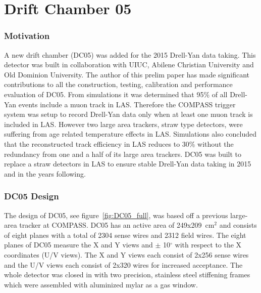 \chapter{Drift Chamber 05}
\subsection{Motivation}
A new drift chamber (DC05) was added for the
2015 Drell-Yan data taking.  This detector was built in collaboration
with UIUC, Abilene Christian University and Old Dominion University.
The author of this prelim paper has made significant contributions to
all the construction, testing, calibration and performance evaluation
of DC05.  From simulations it was determined
that 95\% of all Drell-Yan events include a muon track in LAS.
Therefore the COMPASS trigger system was setup to record Drell-Yan
data only when at least one muon track is included in LAS.
However two large area trackers, straw type detectors, were suffering
from age related temperature effects in LAS.  Simulations also
concluded that the reconstructed track efficiency in LAS reduces to
30\% without the redundancy from one and a half of its large area
trackers.  DC05 was built to replace a straw detectors in LAS to
ensure stable Drell-Yan data taking in 2015 and in the years
following.

\subsection{DC05 Design}


The design of DC05, see figure~\ref{fig:DC05_full}, was based off a
previous large-area tracker at COMPASS.  DC05 has an active area of
249x209~cm$^2$ and consists of eight planes with a total of 2304 sense
wires and 2312 field wires.  The eight planes of DC05 measure the X and Y
views and $\pm$ 10$^{\circ}$ with respect to the X coordinates (U/V
views).  The X and Y views each consist of 2x256 sense wires and the
U/V views each consist of 2x320 wires for increased acceptance. The
whole detector was closed in with two precision, stainless steel
stiffening frames which were assembled with aluminized mylar as a gas
window. \par

